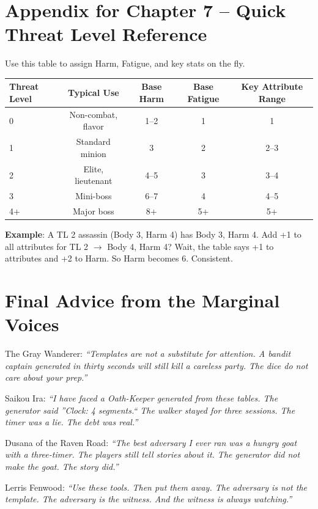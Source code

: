 \section*{Appendix for Chapter 7 -- Quick Threat Level Reference}

\noindent Use this table to assign Harm, Fatigue, and key stats on the fly.

\begin{tabular}{|l|c|c|c|c|}
\hline
\textbf{Threat Level} & \textbf{Typical Use} & \textbf{Base Harm} & \textbf{Base Fatigue} & \textbf{Key Attribute Range} \\
\hline
0 & Non-combat, flavor & 1--2 & 1 & 1 \\
1 & Standard minion & 3 & 2 & 2--3 \\
2 & Elite, lieutenant & 4--5 & 3 & 3--4 \\
3 & Mini-boss & 6--7 & 4 & 4--5 \\
4+ & Major boss & 8+ & 5+ & 5+ \\
\hline
\end{tabular}

\noindent\textbf{Example}: A TL 2 assassin (Body 3, Harm 4) has Body 3, Harm 4. Add +1 to all attributes for TL 2 $\rightarrow$ Body 4, Harm 4? Wait, the table says +1 to attributes and +2 to Harm. So Harm becomes 6. Consistent.


\section*{Final Advice from the Marginal Voices}

\noindent The Gray Wanderer: \emph{``Templates are not a substitute for attention. A bandit captain generated in thirty seconds will still kill a careless party. The dice do not care about your prep.''}

\noindent Saikou Ira: \emph{``I have faced a Oath-Keeper generated from these tables. The generator said ''Clock: 4 segments.`` The walker stayed for three sessions. The timer was a lie. The debt was real.''}

\noindent Dusana of the Raven Road: \emph{``The best adversary I ever ran was a hungry goat with a three-timer. The players still tell stories about it. The generator did not make the goat. The story did.''}

\noindent Lerris Fenwood: \emph{``Use these tools. Then put them away. The adversary is not the template. The adversary is the witness. And the witness is always watching.''}

